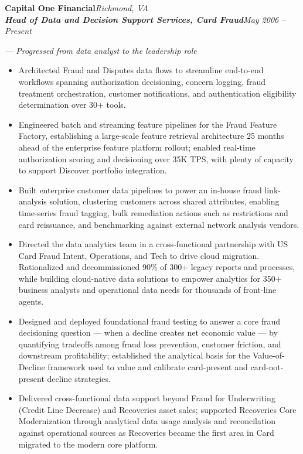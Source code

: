 \documentclass[letterpaper,10pt]{article}
\newcommand{\resumeItem}{\item}
\newcommand{\resumeSubheading}[4]{
    \noindent\textbf{#1}\hfill \textit{#2}\\
    \textbf{\textit{#3}}\hfill \textit{#4}\par
    \vspace{-3pt}
}
\newcommand{\resumeNote}[1]{
    \vspace{3pt}
    \noindent\hspace{1em}\textit{--- #1}\par
    \vspace{-3pt}
}
\begin{document}
\resumeSubheading
{Capital One Financial} {Richmond, VA}
{Head of Data and Decision Support Services, Card Fraud} {May 2006 -- Present}
\resumeNote{Progressed from data analyst to the leadership role}
\begin{itemize}
     \resumeItem Architected Fraud and Disputes data flows to streamline end-to-end workflows spanning authorization decisioning, concern logging, fraud treatment orchestration, customer notifications, and authentication eligibility determination over 30+ tools.
    \resumeItem Engineered batch and streaming feature pipelines for the Fraud Feature Factory, establishing a large-scale feature retrieval architecture 25 months ahead of the enterprise feature platform rollout; enabled real-time authorization scoring and decisioning over 35K TPS, with plenty of capacity to support Discover portfolio integration.
    \resumeItem Built enterprise customer data pipelines to power an in-house fraud link-analysis solution, clustering customers across shared attributes, enabling time-series fraud tagging, bulk remediation actions such as restrictions and card reissuance, and benchmarking against external network analysis vendors.
    \resumeItem Directed the data analytics team in a cross-functional partnership with US Card Fraud Intent, Operations, and Tech to drive cloud migration. Rationalized and decommissioned 90\% of 300+ legacy reports and processes, while building cloud-native data solutions to empower analytics for 350+ business analysts and operational data needs for thousands of front-line agents.
    \resumeItem Designed and deployed foundational fraud testing to answer a core fraud decisioning question — when a decline creates net economic value — by quantifying tradeoffs among fraud loss prevention, customer friction, and downstream profitability; established the analytical basis for the Value-of-Decline framework used to value and calibrate card-present and card-not-present decline strategies.
	\resumeItem Delivered cross-functional data support beyond Fraud for Underwriting (Credit Line Decrease) and Recoveries asset sales; supported Recoveries Core Modernization through analytical data usage analysis and reconcilation against operational sources as Recoveries became the first area in Card migrated to the modern core platform.
\end{itemize}
\end{document}
